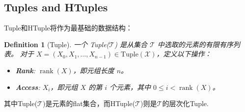 \documentclass{article}
\newtheorem{definition}{Definition}[section]
\begin{document}
\subsection{Tuples and HTuples}
Tuple和HTuple将作为最基础的数据结构：
\begin{definition}[Tuple]
一个 Tuple($\mathcal{T}$) 是从集合 $\mathcal{T}$ 中选取的元素的有限有序列表。
对于 $X = (X_0, X_1, \ldots, X_{n-1}) \in \mathrm{Tuple}(\mathcal{X})$，定义以下操作：
\begin{itemize}
\item \textbf{Rank}: $\operatorname{rank}(X)$，即元组长度 $n$。
\item \textbf{Access}: $X_i$，即元组 $X$ 的第 $i$ 个元素，其中 $0 \le i < \operatorname{rank}(X)$。
\end{itemize}
\end{definition}
其中Tuple($\mathcal{T}$)是元素的flat集合，而HTuple($\mathcal{T}$)则是$\mathcal{T}$的层次化Tuple.
\end{document}
